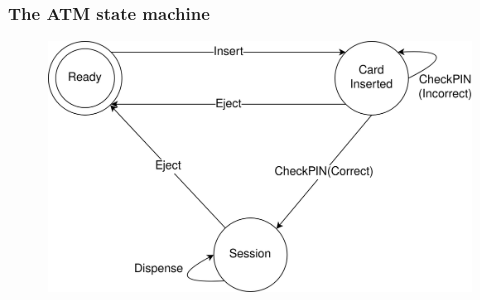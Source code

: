 \documentclass[compress]{beamer}
\begin{document}
\begin{frame}
  \frametitle{The ATM state machine}

  \begin{figure}
    \centering
    \includegraphics[alt={A state diagram of an ATM, with circles for each state: Ready, CardInserted, and Session; labelled arrows between the states; with the labels containing the transition names: Insert, Dispense, CheckPIN(Correct), CheckPIN(Incorrect), and Eject.},width=0.8\framewidth]{ATM.png}
  \end{figure}
  \vspace*{-1cm}

\end{frame}
\end{document}
